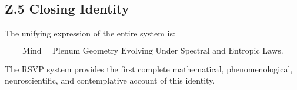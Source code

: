 \documentclass[12pt]{article}
\begin{document}
\subsection*{Z.5 Closing Identity}

The unifying expression of the entire system is:

\[
\boxed{
\text{Mind} = \text{Plenum Geometry Evolving Under Spectral and Entropic Laws}.
}
\]

The RSVP system provides the first complete mathematical, phenomenological, 
neuroscientific, and contemplative account of this identity.

\end{document}
